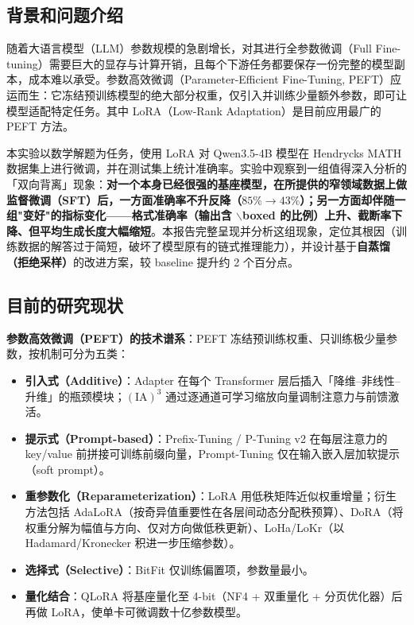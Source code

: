 
\subsection{背景和问题介绍}

随着大语言模型（LLM）参数规模的急剧增长，对其进行全参数微调（Full Fine-tuning）需要巨大的显存与计算开销，且每个下游任务都要保存一份完整的模型副本，成本难以承受。参数高效微调（Parameter-Efficient Fine-Tuning, PEFT）应运而生：它冻结预训练模型的绝大部分权重，仅引入并训练少量额外参数，即可让模型适配特定任务。其中 LoRA（Low-Rank Adaptation）是目前应用最广的 PEFT 方法。

本实验以数学解题为任务，使用 LoRA 对 Qwen3.5-4B 模型在 Hendrycks MATH 数据集上进行微调，并在测试集上统计准确率。实验中观察到一组值得深入分析的「双向背离」现象：\textbf{对一个本身已经很强的基座模型，在所提供的窄领域数据上做监督微调（SFT）后，一方面准确率不升反降（$85\%\to43\%$）；另一方面却伴随一组"变好"的指标变化——格式准确率（输出含 $\backslash$boxed 的比例）上升、截断率下降、但平均生成长度大幅缩短}。本报告完整呈现并分析这组现象，定位其根因（训练数据的解答过于简短，破坏了模型原有的链式推理能力），并设计基于\textbf{自蒸馏（拒绝采样）}的改进方案，较 baseline 提升约 2 个百分点。

\subsection{目前的研究现状}

\textbf{参数高效微调（PEFT）的技术谱系}：PEFT 冻结预训练权重、只训练极少量参数，按机制可分为五类：
\begin{itemize}
  \item \textbf{引入式（Additive）}：Adapter 在每个 Transformer 层后插入「降维–非线性–升维」的瓶颈模块；$(\text{IA})^3$ 通过逐通道可学习缩放向量调制注意力与前馈激活。
  \item \textbf{提示式（Prompt-based）}：Prefix-Tuning / P-Tuning v2 在每层注意力的 key/value 前拼接可训练前缀向量，Prompt-Tuning 仅在输入嵌入层加软提示（soft prompt）。
  \item \textbf{重参数化（Reparameterization）}：LoRA 用低秩矩阵近似权重增量；衍生方法包括 AdaLoRA（按奇异值重要性在各层间动态分配秩预算）、DoRA（将权重分解为幅值与方向、仅对方向做低秩更新）、LoHa/LoKr（以 Hadamard/Kronecker 积进一步压缩参数）。
  \item \textbf{选择式（Selective）}：BitFit 仅训练偏置项，参数量最小。
  \item \textbf{量化结合}：QLoRA 将基座量化至 4-bit（NF4 + 双重量化 + 分页优化器）后再做 LoRA，使单卡可微调数十亿参数模型。
\end{itemize}

